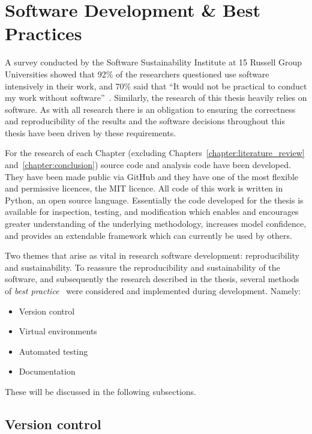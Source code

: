 \section{Software Development \& Best Practices}\label{section:introduction_software_development}

A survey conducted by the Software Sustainability Institute at 15 Russell Group
Universities showed that 92\% of the researchers questioned use software
intensively in their work, and 70\% said that ``It would not be practical to
conduct my work without software''~\cite{ssi_blog}. Similarly, the research of
this thesis heavily relies on software. As with all research there is an
obligation to ensuring the correctness and reproducibility of the results and the
software decisions throughout this thesis have been driven by these
requirements.

For the research of each Chapter (excluding Chapters~\ref{chapter:literature_review}
and~\ref{chapter:conclusion}) source code and analysis code have been developed.
They have been made public via GitHub and they have one of the most flexible and
permissive licences, the MIT licence. All code of this work is written in Python, an open source
language. Essentially the code developed for the thesis is available for inspection,
testing, and modification which enables and encourages
greater understanding of the underlying methodology, increases model confidence,
and provides an extendable framework which can currently be used by others.

Two themes that arise as vital in research software development:
reproducibility and sustainability. To reassure the reproducibility and
sustainability of the software, and subsequently the research described in the
thesis, several methods of
\textit{best practice}~\cite{Aberdour2007, Benureau2018, Crick2014, Hong2015}
were considered and implemented during development. Namely:

\begin{itemize}
    \item Version control
    \item Virtual environments
    \item Automated testing
    \item Documentation
\end{itemize}

These will be discussed in the following subsections.

\subsection{Version control}

